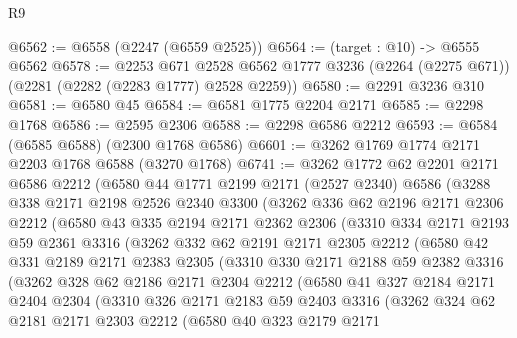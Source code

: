\begin{lexlean}{R9}
\begin{coremodule}
@6562 := @6558 (@2247 (@6559 @2525))
@6564 := (target : @10) -> @6555 @6562
@6578 := @2253
    @671
    @2528
    @6562
    @1777
    @3236
    (@2264 (@2275 @671))
    (@2281 (@2282 (@2283 @1777) @2528 @2259))
@6580 := @2291 @3236 @310
@6581 := @6580 @45
@6584 := @6581 @1775 @2204 @2171
@6585 := @2298 @1768
@6586 := @2595 @2306
@6588 := @2298 @6586 @2212
@6593 := @6584 (@6585 @6588) (@2300 @1768 @6586)
@6601 := @3262 @1769 @1774 @2171 @2203 @1768 @6588 (@3270 @1768)
@6741 := @3262
    @1772
    @62
    @2201
    @2171
    @6586
    @2212
    (@6580
      @44
      @1771
      @2199
      @2171
      (@2527 @2340)
      @6586
      (@3288
        @338
        @2171
        @2198
        @2526
        @2340
        @3300
        (@3262
          @336
          @62
          @2196
          @2171
          @2306
          @2212
          (@6580
            @43
            @335
            @2194
            @2171
            @2362
            @2306
            (@3310
              @334
              @2171
              @2193
              @59
              @2361
              @3316
              (@3262
                @332
                @62
                @2191
                @2171
                @2305
                @2212
                (@6580
                  @42
                  @331
                  @2189
                  @2171
                  @2383
                  @2305
                  (@3310
                    @330
                    @2171
                    @2188
                    @59
                    @2382
                    @3316
                    (@3262
                      @328
                      @62
                      @2186
                      @2171
                      @2304
                      @2212
                      (@6580
                        @41
                        @327
                        @2184
                        @2171
                        @2404
                        @2304
                        (@3310
                          @326
                          @2171
                          @2183
                          @59
                          @2403
                          @3316
                          (@3262
                            @324
                            @62
                            @2181
                            @2171
                            @2303
                            @2212
                            (@6580
                              @40
                              @323
                              @2179
                              @2171

\end{coremodule}
\end{lexlean}
